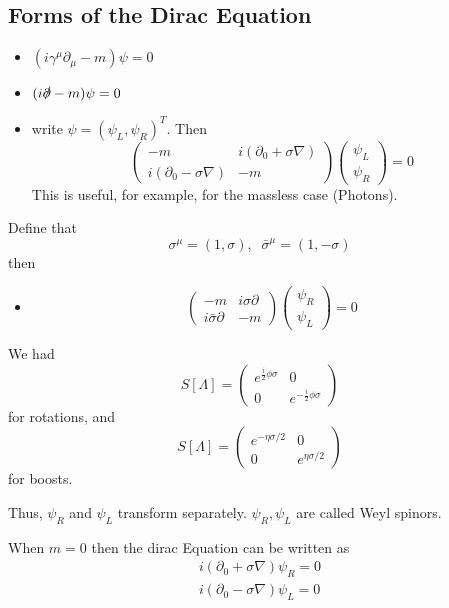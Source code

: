 \documentclass[]{scrartcl}
\begin{document}
\subsection{Forms of the Dirac Equation}
\begin{itemize}
	\item $(i\gamma^\mu\partial_\mu - m)\psi = 0$
	\item $(i\slashed\partial - m)\psi = 0$
	\item write $\psi = (\psi_L, \psi_R)^T$. Then
	$$
	\begin{pmatrix}
		-m & i(\partial_0 + \sigma\nabla)\\
		i(\partial_0 - \sigma\nabla) & -m
	\end{pmatrix}
	\begin{pmatrix}
		\psi_L \\ \psi_R
	\end{pmatrix}
	= 0
	$$
	This is useful, for example, for the massless case (Photons).
\end{itemize}
Define that
$$
\sigma^\mu = (1, \sigma),\;\;\bar\sigma^\mu = (1, -\sigma)
$$
then
\begin{itemize}
	\item
	$$
	\begin{pmatrix}
		-m & i\sigma\partial\\
		i\bar\sigma\partial & -m
	\end{pmatrix}
	\begin{pmatrix}
		\psi_R \\ \psi_L
	\end{pmatrix} = 0
	$$
\end{itemize}
We had
$$
S[\Lambda] = 
\begin{pmatrix}
	e^{\frac{i}{2}\phi\sigma} & 0\\
	0 & e^{-\frac{i}{2}\phi\sigma}
\end{pmatrix}
$$
for rotations, and
$$
S[\Lambda] =
\begin{pmatrix}
	e^{-\eta\sigma/2} & 0\\
	0 & e^{\eta\sigma/2}
\end{pmatrix}
$$
for boosts.

Thus, $\psi_R$ and $\psi_L$ transform separately. $\psi_R, \psi_L$ are called Weyl spinors.

When $m=0$ then the dirac Equation can be written as
\begin{gather}
	i(\partial_0 + \sigma\nabla)\psi_R = 0\\
	i(\partial_0 - \sigma\nabla)\psi_L = 0
\end{gather}
\end{document}
